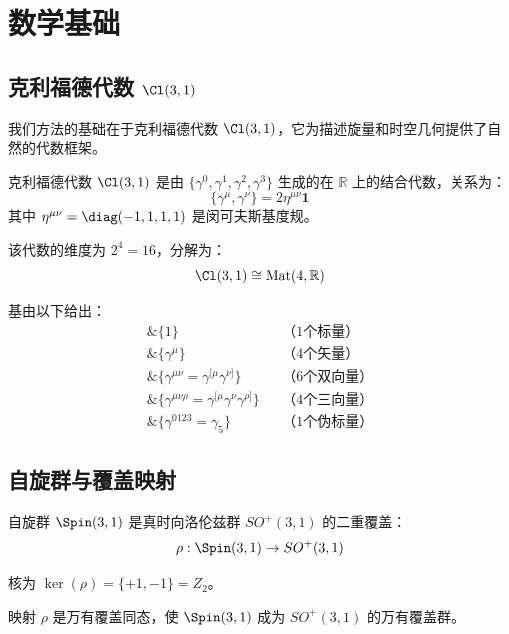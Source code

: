 \section{数学基础}
\label{sec:math}

\subsection{克利福德代数 $\Cl(3,1)$}

我们方法的基础在于克利福德代数 $\Cl(3,1)$，它为描述旋量和时空几何提供了自然的代数框架。

\begin{definition}[克利福德代数]
克利福德代数 $\Cl(3,1)$ 是由 $\{\gamma^0, \gamma^1, \gamma^2, \gamma^3\}$ 生成的在 $\mathbb{R}$ 上的结合代数，关系为：
\begin{equation}
    \{\gamma^\mu, \gamma^\nu\} = 2\eta^{\mu\nu} \mathbf{1}
\end{equation}
其中 $\eta^{\mu\nu} = \diag(-1, 1, 1, 1)$ 是闵可夫斯基度规。
\end{definition}

该代数的维度为 $2^4 = 16$，分解为：
\begin{equation}
    \Cl(3,1) \cong \text{Mat}(4, \mathbb{R})
\end{equation}

基由以下给出：
\begin{align}
    \&\{1\} && \text{（1个标量）} \\
    \&\{\gamma^\mu\} && \text{（4个矢量）} \\
    \&\{\gamma^{\mu\nu} = \gamma^{[\mu}\gamma^{\nu]}\} && \text{（6个双向量）} \\
    \&\{\gamma^{\mu\nu\rho} = \gamma^{[\mu}\gamma^\nu\gamma^{\rho]}\} && \text{（4个三向量）} \\
    \&\{\gamma^{0123} = \gamma_5\} && \text{（1个伪标量）}
\end{align}

\subsection{自旋群与覆盖映射}

自旋群 $\Spin(3,1)$ 是真时向洛伦兹群 $SO^+(3,1)$ 的二重覆盖：
\begin{equation}
    \rho: \Spin(3,1) \to SO^+(3,1)
\end{equation}

核为 $\ker(\rho) = \{+1, -1\} = Z_2$。

\begin{theorem}[万有覆盖]
映射 $\rho$ 是万有覆盖同态，使 $\Spin(3,1)$ 成为 $SO^+(3,1)$ 的万有覆盖群。
\end{theorem}

